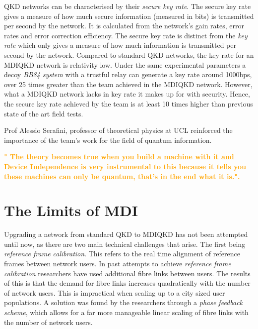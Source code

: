 \documentclass[journal]{vgtc}
\begin{document}
QKD networks can be characterised by their \textit{secure key rate}.  The secure key rate gives a measure of how much secure information (measured in bits) is transmitted per second by the network. It is calculated from the network's gain rates, error rates and error correction efficiency. The secure key rate is distinct from the \textit{key rate} which only gives a measure of how much information is transmitted per second by the network. Compared to standard QKD networks, the key rate for an MDIQKD network is relativity low. Under the same experimental parameters a decoy \textit{BB84 system} with a trustful relay can generate a key rate around 1000bps, over 25 times greater than the team achieved in the MDIQKD network. However, what a MDIQKD network lacks in key rate it makes up for with security. Hence, the secure key rate achieved by the team is at least 10 times higher than previous state of the art field tests.

\vspace{0.3cm}

\noindent Prof Alessio Serafini, professor of theoretical physics at UCL reinforced the importance of the team's work for the field of quantum information.

\vspace{0.3cm}

\textcolor{orange}{\textbf{" The theory becomes true when you build a machine with it and Device Independence is very instrumental to this because it tells you these machines can only be quantum, that's in the end what it is.".}}

\section{The Limits of MDI}

Upgrading a network from standard QKD to MDIQKD has not been attempted until now, as there are two main technical challenges that arise. The first being \textit{reference frame calibration}. This refers to the real time alignment of reference frames between network users. In past attempts to achieve \textit{reference frame calibration} researchers have used additional fibre links between users. The results of this is that the demand for fibre links increases quadratically with the number of network users. This is impractical when scaling up to a city sized user populations. A solution was found by the researchers through a \textit{phase feedback scheme}, which allows for a far more manageable linear scaling of fibre links with the number of network users.
\end{document}
